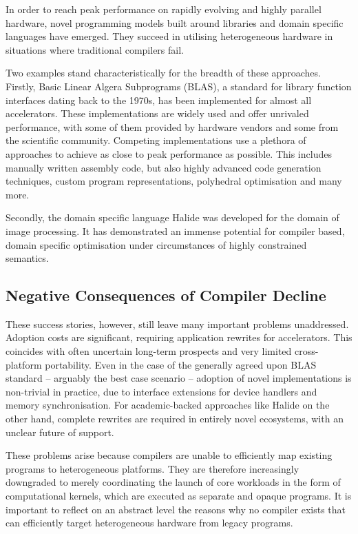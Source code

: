     In order to reach peak performance on rapidly evolving and highly parallel
    hardware, novel programming models built around libraries and domain
    specific languages have emerged.
    They succeed in utilising heterogeneous hardware in situations where
    traditional compilers fail.

    Two examples stand characteristically for the breadth of these approaches.
    Firstly, Basic Linear Algera Subprograms (BLAS), a standard for library
    function interfaces dating back to the 1970s, has been implemented for
    almost all accelerators.
    These implementations are widely used and offer unrivaled performance, with
    some of them provided by hardware vendors and some from the scientific
    community.
    Competing implementations use a plethora of approaches to achieve as close
    to peak performance as possible.
    This includes manually written assembly code, but also highly advanced
    code generation techniques, custom program representations, polyhedral
    optimisation and many more.

    Secondly, the domain specific language Halide was developed for the domain
    of image processing.
    It has demonstrated an immense potential for compiler based, domain specific
    optimisation under circumstances of highly constrained semantics.

\subsection{Negative Consequences of Compiler Decline}

    These success stories, however, still leave many important problems
    unaddressed.
    Adoption costs are significant, requiring application rewrites for
    accelerators.
    This coincides with often uncertain long-term prospects and very limited
    cross-platform portability.
    Even in the case of the generally agreed upon BLAS standard -- arguably the
    best case scenario -- adoption of novel implementations is non-trivial in
    practice, due to interface extensions for device handlers and memory
    synchronisation.
    For academic-backed approaches like Halide on the other hand, complete
    rewrites are required in entirely novel ecosystems, with an unclear future
    of support.

    These problems arise because compilers are unable to efficiently map
    existing programs to heterogeneous platforms.
    They are therefore increasingly downgraded to merely coordinating the launch
    of core workloads in the form of computational kernels, which are
    executed as separate and opaque programs.
    It is important to reflect on an abstract level the reasons why no compiler
    exists that can efficiently target heterogeneous hardware from legacy
    programs.

